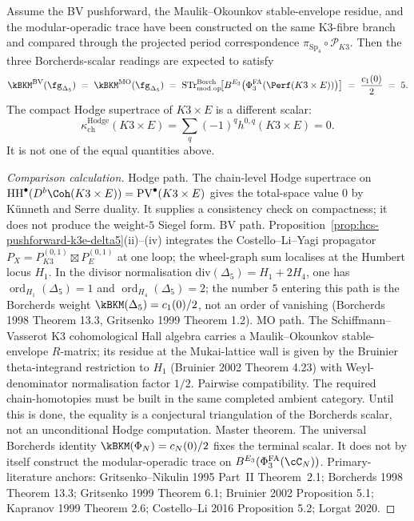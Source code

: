 \begin{conjecture}[Three-path chain-level triangulation at \texorpdfstring{$N = 1$}{N=1}]
\label{cor:k3e-delta5-three-path-triangulation}
\ClaimStatusConjectured
Assume the BV pushforward, the Maulik--Okounkov stable-envelope residue, and the modular-operadic trace have been constructed on the same K3-fibre branch and compared through the projected period correspondence \(\pi_{\mathrm{Sp}_4}\circ\mathscr P_{K3}\). Then the three Borcherds-scalar readings are expected to satisfy
\[
 \kBKM^{\mathrm{BV}}(\fg_{\Delta_5})
 \;=\;
 \kBKM^{\mathrm{MO}}(\fg_{\Delta_5})
 \;=\;
 \mathrm{STr}^{\mathrm{Borch}}_{\mathrm{mod.op}}\!\bigl[B^{E_3}\bigl(\PhiFA_3(\Perf(K3 \times E))\bigr)\bigr]
 \;=\; \frac{c_1(0)}{2} \;=\; 5.
\]
The compact Hodge supertrace of \(K3\times E\) is a different scalar:
\[
 \kappa_{\mathrm{ch}}^{\mathrm{Hodge}}(K3\times E)
 =
 \sum_q(-1)^q h^{0,q}(K3\times E)
 =
 0.
\]
It is not one of the equal quantities above.
\end{conjecture}

\begin{proof}[Comparison calculation]
Hodge path. The chain-level Hodge supertrace on \(\mathrm{HH}^\bullet(D^b\Coh(K3\times E))=\mathrm{PV}^\bullet(K3\times E)\) gives the total-space value \(0\) by Künneth and Serre duality. It supplies a consistency check on compactness; it does not produce the weight-\(5\) Siegel form.
BV path. Proposition~\ref{prop:hcs-pushforward-k3e-delta5}(ii)--(iv) integrates the Costello--Li--Yagi propagator $P_X = P_{K3}^{(0,1)} \boxtimes P_E^{(0,1)}$ at one loop; the wheel-graph sum localises at the Humbert locus $H_1$. In the divisor normalisation $\mathrm{div}(\Delta_5)=H_1+2H_4$, one has $\operatorname{ord}_{H_1}(\Delta_5)=1$ and $\operatorname{ord}_{H_4}(\Delta_5)=2$; the number $5$ entering this path is the Borcherds weight $\kBKM(\Delta_5)=c_1(0)/2$, not an order of vanishing (Borcherds 1998 Theorem 13.3, Gritsenko 1999 Theorem 1.2).
MO path. The Schiffmann--Vasserot K3 cohomological Hall algebra carries a Maulik--Okounkov stable-envelope $R$-matrix; its residue at the Mukai-lattice wall is given by the Bruinier theta-integrand restriction to $H_1$ (Bruinier 2002 Theorem 4.23) with Weyl-denominator normalisation factor $1/2$.
Pairwise compatibility. The required chain-homotopies must be built in the same completed ambient category. Until this is done, the equality is a conjectural triangulation of the Borcherds scalar, not an unconditional Hodge computation.
Master theorem. The universal Borcherds identity $\kBKM(\Phi_N)=c_N(0)/2$ fixes the terminal scalar. It does not by itself construct the modular-operadic trace on \(B^{E_3}(\PhiFA_3(\cC_N))\).
Primary-literature anchors: Gritsenko--Nikulin 1995 Part~II Theorem~2.1; Borcherds 1998 Theorem 13.3; Gritsenko 1999 Theorem 6.1; Bruinier 2002 Proposition 5.1; Kapranov 1999 Theorem 2.6; Costello--Li 2016 Proposition 5.2; Lorgat 2020.
\end{proof}

